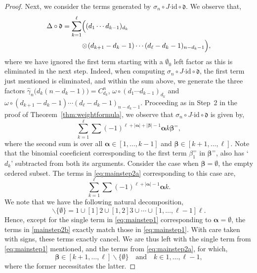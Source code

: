 \documentclass[5p,twocolumn]{elsarticle}
\newcommand*{\id}{{\mathrm{id}}}
\newcommand*{\df}{\mathfrak d}
\newcommand*{\cendot}{\boldsymbol{\cdot}}
\newcommand*{\balpha}{\boldsymbol{\alpha}}
\newcommand*{\bbeta}{\boldsymbol{\beta}}
\begin{document}
\begin{proof}
Next, we consider the terms generated by $\sigma_n\circ J\cendot\id\circ\df$. We observe that,
\begin{align*}
  \Delta\circ\df=\sum_{k=1}^\ell&\Bigl((d_1\cdots d_{k-1})_{d_k}\\
                               &\!\otimes\!(d_{k+1}-d_k-1)\cdots(d_\ell-d_k-1)_{n-d_k-1}\Bigr),
\end{align*}
where we have ignored the first term starting with a $\emptyset_0$ left factor as this is eliminated in the next step.
Indeed, when computing $\sigma_n\circ J\cendot\id\circ\df$, the first term just mentioned is eliminated, and within the sum above,
we generate the three factors $\hat{\gamma}_n\bigl(d_k(n-d_k-1)\bigr)=C_{d_k}^n$, $\omega\circ(d_1\cdots d_{k-1})_{d_k}$ and $\omega\circ(d_{k+1}-d_k-1)\cdots(d_\ell-d_k-1)_{n-d_k-1}$.
Proceeding as in Step~2 in the proof of Theorem~\ref{thm:weightformula}, we observe that $\sigma_n\circ J\cendot\id\circ\df$ is given by,
\begin{equation}
  \sum_{k=1}^\ell\sum(-1)^{\ell+|\balpha|+|\bbeta|-1}\balpha k\bbeta^=,\label{eq:mainstep2a}
\end{equation}
where the second sum is over all $\balpha\in[1,\ldots,k-1]$ and $\bbeta\in[k+1,\ldots,\ell]$.
Note that the binomial coeeficient corresponding to the first term $\beta_1^=$ in $\bbeta^=$, also has `$d_k$' subtracted from both its arguments.
Consider the case when $\bbeta=\emptyset$, the empty ordered subset. The terms in \eqref{eq:mainstep2a} corresponding to this case are,
\begin{equation}\label{mainstep2b}
  \sum_{k=1}^\ell\sum(-1)^{\ell+|\balpha|-1}\balpha k.
\end{equation}
We note that we have the following natural decomposition,
\begin{equation*}
[1,\ldots,\ell]\backslash\{\emptyset\}=1\cup[1]2\cup[1,2]3\cup\cdots\cup[1,\ldots,\ell-1]\ell.
\end{equation*}
Hence, except for the single term in \eqref{eq:mainstep1} corresponding to $\balpha=\emptyset$, the terms in \eqref{mainstep2b} exactly match those in \eqref{eq:mainstep1}.
With care taken with signs, these terms exactly cancel. We are thus left with the single term from \eqref{eq:mainstep1} mentioned, and the terms from \eqref{eq:mainstep2a}, for which,
\begin{equation}\label{eq:mainconds2}
  \bbeta\in[k+1,\ldots,\ell]\backslash\{\emptyset\}\quad\text{and}\quad k\in1,\ldots,\ell-1,
\end{equation}
where the former necessitates the latter.


\end{proof}
\end{document}
